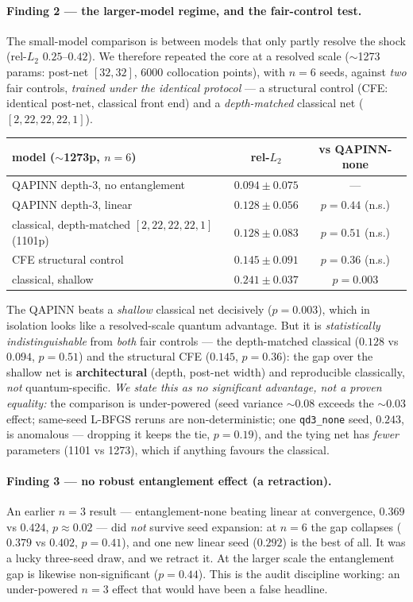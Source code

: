 \documentclass[11pt]{article}
\begin{document}
\paragraph{Finding 2 --- the larger-model regime, and the fair-control test.} The
small-model comparison is between models that only partly resolve the shock
(rel-$L_2$ $0.25$--$0.42$). We therefore repeated the core at a resolved scale
($\sim$1273 params: post-net $[32,32]$, 6000 collocation points), with $n=6$ seeds,
against \emph{two} fair controls, \emph{trained under the identical protocol} --- a
structural control (CFE: identical post-net, classical front end) and a
\emph{depth-matched} classical net ($[2,22,22,22,1]$).
\begin{center}\small\begin{tabular}{lcc}\toprule
model ($\sim$1273p, $n{=}6$) & rel-$L_2$ & vs QAPINN-none \\ \midrule
QAPINN depth-3, no entanglement & $\mathbf{0.094 \pm 0.075}$ & --- \\
QAPINN depth-3, linear          & $0.128 \pm 0.056$ & $p=0.44$ (n.s.) \\
classical, depth-matched $[2,22,22,22,1]$ (1101p) & $0.128 \pm 0.083$ & $p=0.51$ (n.s.) \\
CFE structural control          & $0.145 \pm 0.091$ & $p=0.36$ (n.s.) \\
classical, shallow              & $0.241 \pm 0.037$ & $p=0.003$ \\
\bottomrule\end{tabular}\end{center}
The QAPINN beats a \emph{shallow} classical net decisively ($p=0.003$), which in
isolation looks like a resolved-scale quantum advantage. But it is \emph{statistically
indistinguishable} from \emph{both} fair controls --- the depth-matched classical
($0.128$ vs $0.094$, $p=0.51$) and the structural CFE ($0.145$, $p=0.36$): the gap
over the shallow net is \textbf{architectural} (depth, post-net width) and
reproducible classically, \emph{not} quantum-specific. \emph{We state this as no
significant advantage, not a proven equality:} the comparison is under-powered (seed
variance $\sim$0.08 exceeds the $\sim$0.03 effect; same-seed L-BFGS reruns are
non-deterministic; one \texttt{qd3\_none} seed, $0.243$, is anomalous --- dropping it
keeps the tie, $p=0.19$), and the tying net has \emph{fewer} parameters (1101 vs
1273), which if anything favours the classical.

\paragraph{Finding 3 --- no robust entanglement effect (a retraction).} An earlier
$n=3$ result --- entanglement-none beating linear at convergence, $0.369$ vs $0.424$,
$p\approx0.02$ --- did \emph{not} survive seed expansion: at $n=6$ the gap collapses
($0.379$ vs $0.402$, $p=0.41$), and one new linear seed ($0.292$) is the best of all.
It was a lucky three-seed draw, and we retract it. At the larger scale the
entanglement gap is likewise non-significant ($p=0.44$). This is the audit discipline
working: an under-powered $n=3$ effect that would have been a false headline.
\end{document}
